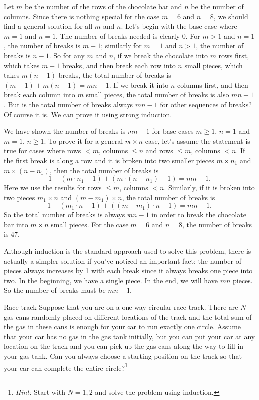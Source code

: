 \begin{solution}
Let $m$ be the number of the rows of the chocolate bar and $n$ be the number of columns. Since there is nothing special for the case $m=6$ and $n=8$, we should find a general solution for all $m$ and $n$. Let's begin with the base case where $m=1$ and $n=1$. The number of breaks needed is clearly 0. For $m>1$ and $n=1$, the number of breaks is $m-1$; similarly for $m=1$ and $n>1$, the number of breaks is $n-1$. So for any $m$ and $n$, if we break the chocolate into $m$ rows first, which takes $m-1$ breaks, and then break each row into $n$ small pieces, which takes $m(n-1)$ breaks, the total number of breaks is $(m-1)+m(n-1)=mn-1$. If we break it into $n$ columns first, and then break each column into $m$ small pieces, the total number of breaks is also $mn-1$. But is the total number of breaks always $mn-1$ for other sequences of breaks? Of course it is. We can prove it using strong induction.

We have shown the number of breaks is $mn-1$ for base cases $m\geq1$, $n=1$ and $m=1$, $n\geq1$. To prove it for a general $m\times n$ case, let's assume the statement is true for cases where rows $<m$, columns $\leq n$ and rows $\leq m$, columns $<n$. If the first break is along a row and it is broken into two smaller pieces $m\times n_1$ and $m\times(n-n_1)$, then the total number of breaks is
\[
1+(m\cdot n_1-1)+(m\cdot(n-n_1)-1)=mn-1.
\]
Here we use the results for rows $\leq m$, columns $<n$. Similarly, if it is broken into two pieces $m_1\times n$ and $(m-m_1)\times n$, the total number of breaks is
\[
1+(m_1\cdot n-1)+((m-m_1)\cdot n-1)=mn-1.
\]
So the total number of breaks is always $mn-1$ in order to break the chocolate bar into $m\times n$ small pieces. For the case $m=6$ and $n=8$, the number of breaks is 47.

Although induction is the standard approach used to solve this problem, there is actually a simpler solution if you've noticed an important fact: the number of pieces always increases by 1 with each break since it always breaks one piece into two. In the beginning, we have a single piece. In the end, we will have $mn$ pieces. So the number of breaks must be $mn-1$.

\end{solution}

\begin{problem}{Race track}
Suppose that you are on a one-way circular race track. There are $N$ gas cans randomly placed on different locations of the track and the total sum of the gas in these cans is enough for your car to run exactly one circle. Assume that your car has no gas in the gas tank initially, but you can put your car at any location on the track and you can pick up the gas cans along the way to fill in your gas tank. Can you always choose a starting position on the track so that your car can complete the entire circle?\footnote[18]{\emph{Hint:} Start with $N=1,2$ and solve the problem using induction.}
\end{problem}

